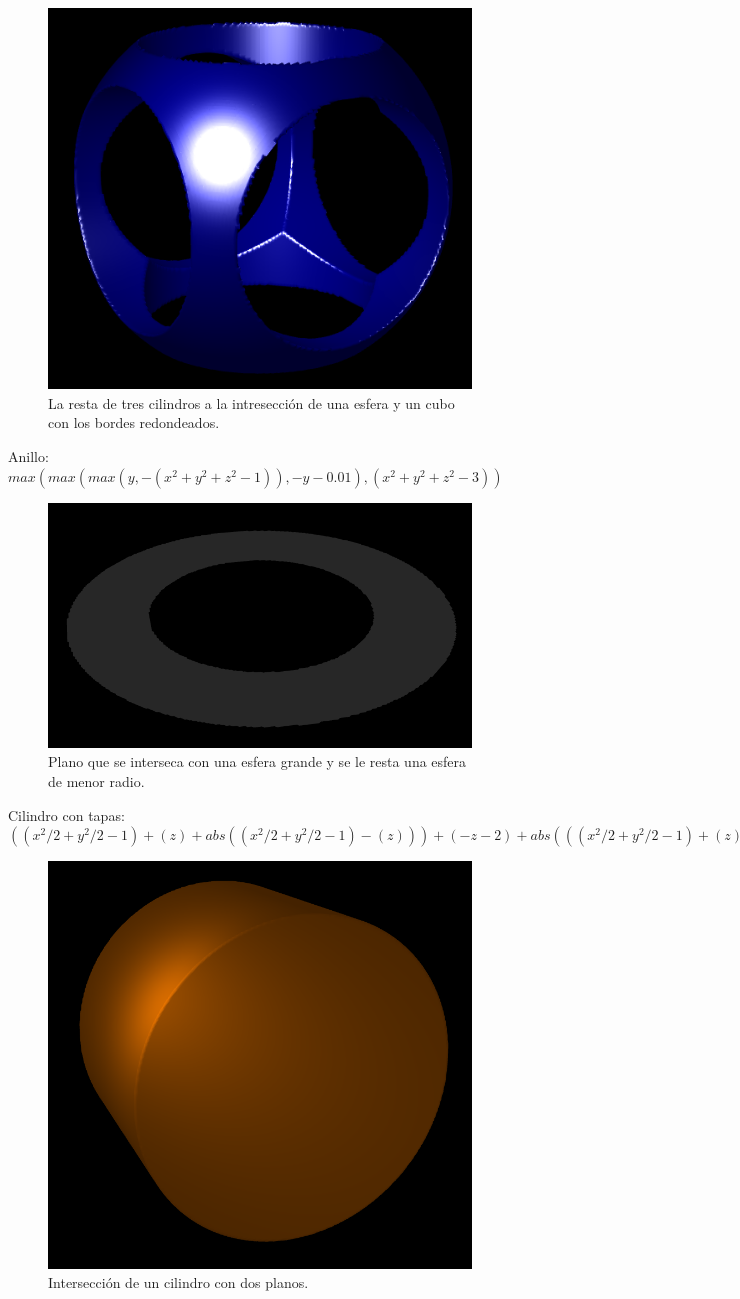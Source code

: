 \documentclass[12pt]{article}
\begin{document}
\begin{figure}[h!]
\includegraphics[width=0.7\linewidth,center]{g2.png}
\caption{La resta de tres cilindros a la intresección de una esfera y un cubo con los bordes redondeados.}
\end{figure}
\clearpage
Anillo: $max(max(max(y,- (x^2 + y^2 + z^2-1)), -y- 0.01), (x^2 +y^2 +z^2 - 3))$ \\
\begin{figure}[h!]
\includegraphics[width=0.7\linewidth,center]{g3.png}
\caption{Plano que se interseca con una esfera grande y se le resta una esfera de menor radio.}
\end{figure}
\clearpage
Cilindro con tapas: $((x^2/2 + y^2/2 - 1) + (z) + abs((x^2/2 + y^2/2 - 1)-(z)))+(-z-2)+abs(((x^2/2 + y^2/2 - 1) + (z) + abs((x^2/2 + y^2/2 - 1)-(z)))-(-z-2))$ \\
\begin{figure}[h!]
\includegraphics[width=0.7\linewidth,center]{g4.png}
\caption{Intersección de un cilindro con dos planos.}
\end{figure}
\end{document}

